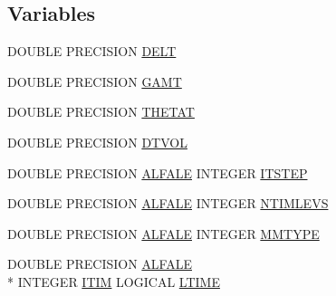 \subsection*{Variables}
\begin{DoxyCompactItemize}
\item 
D\-O\-U\-B\-L\-E P\-R\-E\-C\-I\-S\-I\-O\-N \hyperlink{msa20_2home_2abonfi_2_c_f_d__codes_2_eul_f_s_83_82_83_2include_2time_8com_acb1f2f1a9ae66911a5f4605d8be61030}{D\-E\-L\-T}
\item 
D\-O\-U\-B\-L\-E P\-R\-E\-C\-I\-S\-I\-O\-N \hyperlink{msa20_2home_2abonfi_2_c_f_d__codes_2_eul_f_s_83_82_83_2include_2time_8com_a13b288a3cbd362cd91ab8edbfe0c08ee}{G\-A\-M\-T}
\item 
D\-O\-U\-B\-L\-E P\-R\-E\-C\-I\-S\-I\-O\-N \hyperlink{msa20_2home_2abonfi_2_c_f_d__codes_2_eul_f_s_83_82_83_2include_2time_8com_aab3d96e8870d35dbccab4b309adb28e8}{T\-H\-E\-T\-A\-T}
\item 
D\-O\-U\-B\-L\-E P\-R\-E\-C\-I\-S\-I\-O\-N \hyperlink{msa20_2home_2abonfi_2_c_f_d__codes_2_eul_f_s_83_82_83_2include_2time_8com_a00486054a38d678ac27310774f9c3d36}{D\-T\-V\-O\-L}
\item 
D\-O\-U\-B\-L\-E P\-R\-E\-C\-I\-S\-I\-O\-N \hyperlink{home_2abonfi_2_c_f_d__codes_2_eul_f_s_83_84_2include_2time_8com_a24382882bb714420b6325844b20852e4}{A\-L\-F\-A\-L\-E} I\-N\-T\-E\-G\-E\-R \hyperlink{msa20_2home_2abonfi_2_c_f_d__codes_2_eul_f_s_83_82_83_2include_2time_8com_a11b72cddc58a44173ab90b066363ce9c}{I\-T\-S\-T\-E\-P}
\item 
D\-O\-U\-B\-L\-E P\-R\-E\-C\-I\-S\-I\-O\-N \hyperlink{home_2abonfi_2_c_f_d__codes_2_eul_f_s_83_84_2include_2time_8com_a24382882bb714420b6325844b20852e4}{A\-L\-F\-A\-L\-E} I\-N\-T\-E\-G\-E\-R \hyperlink{msa20_2home_2abonfi_2_c_f_d__codes_2_eul_f_s_83_82_83_2include_2time_8com_a2ca5d60c37515ae15ddd21e5da9abcf1}{N\-T\-I\-M\-L\-E\-V\-S}
\item 
D\-O\-U\-B\-L\-E P\-R\-E\-C\-I\-S\-I\-O\-N \hyperlink{home_2abonfi_2_c_f_d__codes_2_eul_f_s_83_84_2include_2time_8com_a24382882bb714420b6325844b20852e4}{A\-L\-F\-A\-L\-E} I\-N\-T\-E\-G\-E\-R \hyperlink{msa20_2home_2abonfi_2_c_f_d__codes_2_eul_f_s_83_82_83_2include_2time_8com_a8ef2ef40e44d2eb096b5c209f6d0b1bc}{M\-M\-T\-Y\-P\-E}
\item 
D\-O\-U\-B\-L\-E P\-R\-E\-C\-I\-S\-I\-O\-N \hyperlink{home_2abonfi_2_c_f_d__codes_2_eul_f_s_83_84_2include_2time_8com_a24382882bb714420b6325844b20852e4}{A\-L\-F\-A\-L\-E} \\*
I\-N\-T\-E\-G\-E\-R \hyperlink{home_2abonfi_2_c_f_d__codes_2_eul_f_s_83_84_2include_2time_8com_a404869822c8c75b527e76a2cc66add73}{I\-T\-I\-M} L\-O\-G\-I\-C\-A\-L \hyperlink{msa20_2home_2abonfi_2_c_f_d__codes_2_eul_f_s_83_82_83_2include_2time_8com_ac761db16f3bf53bd70f0a5b7409bb16f}{L\-T\-I\-M\-E}

\end{DoxyCompactItemize}
